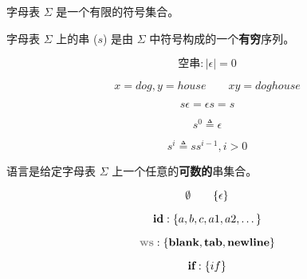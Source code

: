 \begin{frame}{}
  \begin{definition}[字母表]
    字母表 $\Sigma$ 是一个有限的符号集合。
  \end{definition}
  
\end{frame}

\begin{frame}{}
  \begin{definition}[串]
    字母表 $\Sigma$ 上的串 ($s$) 是由 $\Sigma$ 中符号构成的一个{\bf 有穷}序列。
  \end{definition}

  \vspace{-0.30cm}
  \[
    \text{空串}: |\epsilon| = 0
  \]
\end{frame}

\begin{frame}{}
  \begin{definition}[串上的``连接''运算]
    \[
      x = dog, y = house \qquad xy = doghouse
    \]

    \[
      s \epsilon = \epsilon s = s
    \]
  \end{definition}

  \pause
  \vspace{0.60cm}
  \begin{definition}[串上的``指数''运算]
    \[
      s^{0} \triangleq \epsilon
    \]

    \[
      s^{i} \triangleq s s^{i-1}, i > 0
    \]
  \end{definition}
\end{frame}

\begin{frame}{}
  \begin{definition}[语言]
    语言是给定字母表 $\Sigma$ 上一个任意的{\bf 可数的}串集合。
  \end{definition}

  \[
    \emptyset \qquad \{\epsilon\}
  \]

  \pause
  \[
    \text{\bf id}: \{a, b, c, a1, a2, \dots\}
  \]

  \[
    \ws: \set{\blank, \tab, \line}
  \]

  \[
    \text{\bf if}: \{if\}
  \]
\end{frame}

